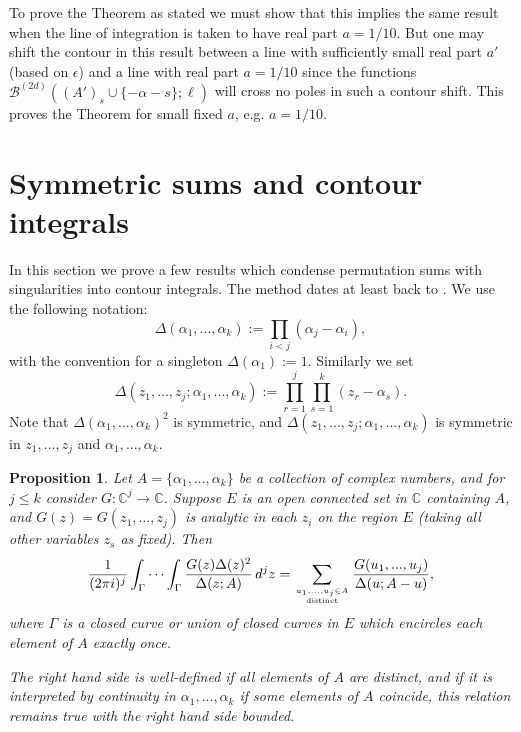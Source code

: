 \documentclass[12pt]{amsart}
\newtheorem{prop}{Proposition}
\begin{document}
	To prove the Theorem as stated we must show that this implies the same result when the line of integration is taken to have real part $a=1/10$. But one may shift the contour in this result between a line with sufficiently small real part $a'$ (based on $\epsilon$) and a line with real part $a = 1/10$ since the  functions $\mathcal{B}^{(2d)}((A')_s\cup \{-\alpha-s\};\ell)$ will cross no poles in such a contour shift. %
	This proves the Theorem for small fixed $a$, e.g. $a = 1/10$.
	
	\appendix
	
	\section{Symmetric sums and contour integrals}
	
	In this section we prove a few results which condense permutation sums with singularities into contour integrals. The method dates at least back to \cite[Sec. 2.5]{CFKRS}. We use the following notation:
	$$
	\Delta(\alpha_1,...,\alpha_k) := \prod_{i < j}(\alpha_j-\alpha_i),
	$$
	with the convention for a singleton $\Delta(\alpha_1):=1$. Similarly we set
	$$
	\Delta(z_1,...,z_j;\alpha_1,...,\alpha_k):= \prod_{r=1}^j \prod_{s=1}^k (z_r-\alpha_s).
	$$
	Note that $\Delta(\alpha_1,...,\alpha_k)^2$ is symmetric, and $\Delta(z_1,...,z_j;\alpha_1,...,\alpha_k)$ is symmetric in $z_1,...,z_j$ and $\alpha_1,...,\alpha_k$.
	
	\begin{prop}
		\label{prop:singlepermutationsum}
		Let $A = \{\alpha_1,...,\alpha_k\}$ be a collection of complex numbers, and for $j \leq k$ consider $G: \mathbb{C}^j \rightarrow \mathbb{C}$. Suppose $E$ is an open connected set in $\mathbb{C}$ containing $A$, and $G(z) = G(z_1,...,z_j)$ is analytic in each $z_i$ on the region $E$ (taking all other variables $z_s$ as fixed). Then
		$$
		\frac{1}{(2\pi i)^j} \int_\Gamma \cdots \int_\Gamma \frac{G(z) \Delta(z)^2}{\Delta(z;A)}\, d^j z = \sum_{u_1,...,u_j \in A \atop \textrm{distinct}} \frac{G(u_1,...,u_j)}{\Delta(u; A-u)},
		$$
		where $\Gamma$ is a closed curve or union of closed curves in $E$ which encircles each element of $A$ exactly once.
		
		The right hand side is well-defined if all elements of $A$ are distinct, and if it is interpreted by continuity in $\alpha_1,...,\alpha_k$ if some elements of $A$ coincide, this relation remains true with the right hand side bounded.
	\end{prop}
	
\end{document}
